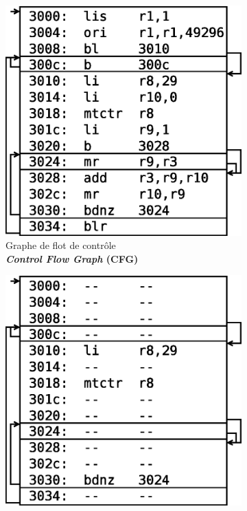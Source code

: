 \documentclass[final]{beamer}
\begin{document}
\begin{frame}
\begin{columns}[t]
\begin{column}{.66\linewidth}
\begin{figure}[ht]
\begin{subfigure}{.30\textwidth}
            \includegraphics{img/recons-new.eps}
            \captionsetup{justification=centering}
            \caption{Graphe de flot de contrôle \\
              \textbf{\emph{Control Flow Graph} (CFG)}}
            \label{fig:recons}
          \end{subfigure}
          \begin{subfigure}{.30\textwidth}
            \centering
            \includegraphics{img/slice-new2.eps}

\end{subfigure}
\end{figure}
\end{column}
\end{columns}
\end{frame}
\end{document}

